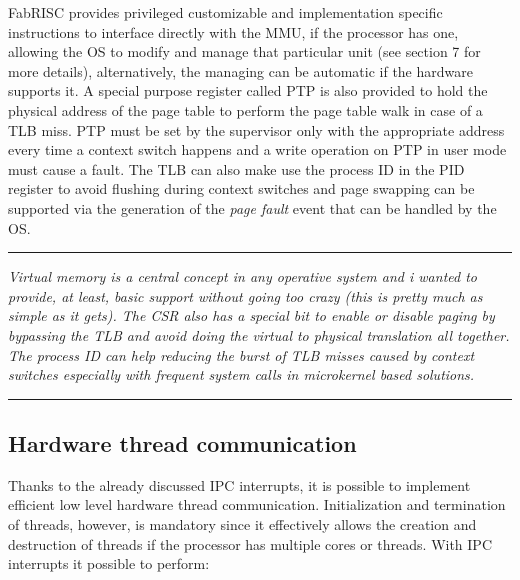 \documentclass{article}
\begin{document}
            FabRISC provides privileged customizable and implementation specific instructions to interface directly with the MMU, if the processor has one, allowing the OS to modify and manage that particular unit (see section 7 for more details), alternatively, the managing can be automatic if the hardware supports it. A special purpose register called PTP is also provided to hold the physical address of the page table to perform the page table walk in case of a TLB miss. PTP must be set by the supervisor only with the appropriate address every time a context switch happens and a write operation on PTP in user mode must cause a fault. The TLB can also make use the process ID in the PID register to avoid flushing during context switches and page swapping can be supported via the generation of the \textit{page fault} event that can be handled by the OS.

        \par\noindent\rule{\textwidth}{0.4pt}
        \textit{Virtual memory is a central concept in any operative system and i wanted to provide, at least, basic support without going too crazy (this is pretty much as simple as it gets). The CSR also has a special bit to enable or disable paging by bypassing the TLB and avoid doing the virtual to physical translation all together. The process ID can help reducing the burst of TLB misses caused by context switches especially with frequent system calls in microkernel based solutions.}
        \par\noindent\rule{\textwidth}{0.4pt}

        \subsection{Hardware thread communication}

            \vspace{10pt}

            Thanks to the already discussed IPC interrupts, it is possible to implement efficient low level hardware thread communication. Initialization and termination of threads, however, is mandatory since it effectively allows the creation and destruction of threads if the processor has multiple cores or threads. With IPC interrupts it possible to perform:
\end{document}
